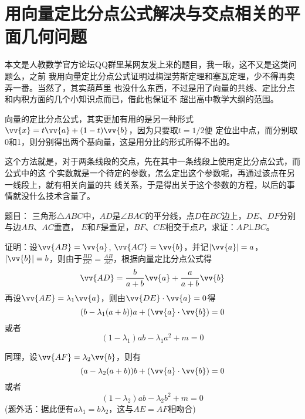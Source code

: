 
\section{用向量定比分点公式解决与交点相关的平面几何问题}
\label{sec:vv-geometry}

本文是人教数学官方论坛QQ群里某网友发上来的题目，我一瞅，这不又是这类问题么，之前 我用向量定比分点公式证明过梅涅劳斯定理和塞瓦定理，少不得再卖弄一番。当然了，其实葫芦里 也没什么东西，不过是用了向量的共线、定比分点和内积方面的几个小知识点而已，借此也保证不 超出高中教学大纲的范围。

向量的定比分点公式，其实更加有用的是另一种形式$\vv{x} = t \vv{a} + (1 - t) \vv{b}$，因为只要取$t = 1 / 2$便 定位出中点，而分别取0和1，则分别得出两个基向量，这是用分比的形式所得不出的。

这个方法就是，对于两条线段的交点，先在其中一条线段上使用定比分点公式，而公式中的这 个实数就是一个待定的参数，怎么定出这个参数呢，再通过该点在另一线段上，就有相关向量的共 线关系，于是得出关于这个参数的方程，以后的事情就没什么技术含量了。

题目： 三角形$\triangle A B C$中，$A D$是$\angle B A C$的平分线，点$D$在$B C$边上，$D E$、$D F$分别与边$A B$、$A C$垂直， $E$和$F$是垂足，$B F$、$C E$相交于点$P$，求证：$A P \bot B C$。

证明：设$\vv{AB} = \vv{a}$, $\vv{A C} = \vv{b}$，并记$| \vv{a} | = a$，$| \vv{b} | = b$，则由于$\frac{B D}{D C} = \frac{A B}{A C}$，根据向量定比分点公式得 
\begin{equation}
\vv{A D} = \frac{b}{a + b} \vv{a} + \frac{a}{a + b} \vv{b}
\end{equation}
 再设$\vv{A E} = \lambda_1 \vv{a}$，则由$\vv{D E} \cdot \vv{a} = 0$得
 \begin{equation}
   \label{eq:vv-geometry-lambda-1}
(b - \lambda_1 (a + b)) a + (\vv{a} \cdot \vv{b}) = 0 
 \end{equation}
或者
\begin{equation}
  \label{eq:vv-geometry-lambda-1-1}
(1 - \lambda_1) a b - \lambda_1 a^2 + m = 0
\end{equation}

同理，设$\vv{A F} = \lambda_2 \vv{b}$，则有
\begin{equation}
  \label{eq:vv-geometry-lambda-2}
(a - \lambda_2 (a + b)) b + (\vv{a} \cdot \vv{b}) = 0
\end{equation}
或者
\begin{equation}
  \label{eq:vv-geometry-lambda-2-1}
(1 - \lambda_2) a b - \lambda_2 b^2 + m = 0
\end{equation}
(题外话：据此便有$a \lambda_1 = b \lambda_2$，这与$A E = A F$相吻合)

